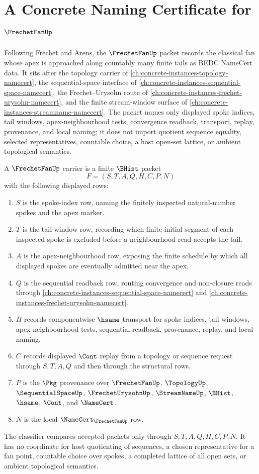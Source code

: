 \chapter{A Concrete Naming Certificate for $\FrechetFanUp$}
\label{ch:concrete-instances-frechet-fan-namecert}

Following Frechet and Arens, the $\FrechetFanUp$ packet records the classical fan whose apex is approached along countably many finite tails as BEDC NameCert data. It sits after the topology carrier of \autoref{ch:concrete-instances-topology-namecert}, the sequential-space interface of \autoref{ch:concrete-instances-sequential-space-namecert}, the Frechet--Urysohn route of \autoref{ch:concrete-instances-frechet-urysohn-namecert}, and the finite stream-window surface of \autoref{ch:concrete-instances-streamname-namecert}. The packet names only displayed spoke indices, tail windows, apex-neighbourhood tests, convergence readback, transport, replay, provenance, and local naming; it does not import quotient sequence equality, selected representatives, countable choice, a host open-set lattice, or ambient topological semantics.

\begin{definition}
\label{def:frechet-fan-carrier}
A $\FrechetFanUp$ carrier is a finite $\BHist$ packet
$$
F=(S,T,A,Q,H,C,P,N)
$$
with the following displayed rows:
\begin{enumerate}
\item $S$ is the spoke-index row, naming the finitely inspected natural-number spokes and the apex marker.
\item $T$ is the tail-window row, recording which finite initial segment of each inspected spoke is excluded before a neighbourhood read accepts the tail.
\item $A$ is the apex-neighbourhood row, exposing the finite schedule by which all displayed spokes are eventually admitted near the apex.
\item $Q$ is the sequential readback row, routing convergence and non-closure reads through \autoref{ch:concrete-instances-sequential-space-namecert} and \autoref{ch:concrete-instances-frechet-urysohn-namecert}.
\item $H$ records componentwise $\hsame$ transport for spoke indices, tail windows, apex-neighbourhood tests, sequential readback, provenance, replay, and local naming.
\item $C$ records displayed $\Cont$ replay from a topology or sequence request through $S,T,A,Q$ and then through the structural rows.
\item $P$ is the $\Pkg$ provenance over $\FrechetFanUp$, $\TopologyUp$, $\SequentialSpaceUp$, $\FrechetUrysohnUp$, $\StreamNameUp$, $\BHist$, $\hsame$, $\Cont$, and $\NameCert$.
\item $N$ is the local $\NameCert_{\FrechetFanUp}$ row.
\end{enumerate}
The classifier compares accepted packets only through $S,T,A,Q,H,C,P,N$. It has no coordinate for host quotienting of sequences, a chosen representative for a fan point, countable choice over spokes, a completed lattice of all open sets, or ambient topological semantics.
\end{definition}

